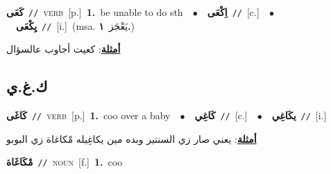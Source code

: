 \documentclass[10pt,a4paper,twoside]{article} %
\begin{document}
\begin{multicols}{2}
{\setlength\topsep{0pt}\textbf{\foreignlanguage{arabic}{كَعَى}}\ {\color{gray}\texttt{//}\color{black}}\ \textsc{verb}\ [p.]\ \textbf{1.}~be unable to do sth\ \ $\bullet$\ \ \setlength\topsep{0pt}\textbf{\foreignlanguage{arabic}{اِكْعَى}}\ {\color{gray}\texttt{//}\color{black}}\ [c.]\ \ $\bullet$\ \ \setlength\topsep{0pt}\textbf{\foreignlanguage{arabic}{يِكْعَى}}\ {\color{gray}\texttt{//}\color{black}}\ [i.]\ \color{gray}(msa. \foreignlanguage{arabic}{يَعْجَز}~\foreignlanguage{arabic}{\textbf{١.}})\color{black}\  \begin{flushright}\color{gray}\foreignlanguage{arabic}{\textbf{\underline{\foreignlanguage{arabic}{أمثلة}}}: كعيت أجاوب عالسؤال}\end{flushright}\color{black}} \vspace{2mm}

\vspace{-3mm}
\subsection*{\color{blue}\foreignlanguage{arabic}{ك.غ.ي}\color{blue}{}} 

{\setlength\topsep{0pt}\textbf{\foreignlanguage{arabic}{كَاغَى}}\ {\color{gray}\texttt{//}\color{black}}\ \textsc{verb}\ [p.]\ \textbf{1.}~coo over a baby\ \ $\bullet$\ \ \setlength\topsep{0pt}\textbf{\foreignlanguage{arabic}{كَاغِي}}\ {\color{gray}\texttt{//}\color{black}}\ [c.]\ \ $\bullet$\ \ \setlength\topsep{0pt}\textbf{\foreignlanguage{arabic}{يكَاغِي}}\ {\color{gray}\texttt{//}\color{black}}\ [i.]\  \begin{flushright}\color{gray}\foreignlanguage{arabic}{\textbf{\underline{\foreignlanguage{arabic}{أمثلة}}}: يعني صار زي السنتير وبده مين يكاغِيله مْكاغاة زي البوبو}\end{flushright}\color{black}} \vspace{2mm}

{\setlength\topsep{0pt}\textbf{\foreignlanguage{arabic}{مْكَاغَاة}}\ {\color{gray}\texttt{//}\color{black}}\ \textsc{noun}\ [f.]\ \textbf{1.}~coo\ } \vspace{2mm}


\end{multicols}
\end{document}
